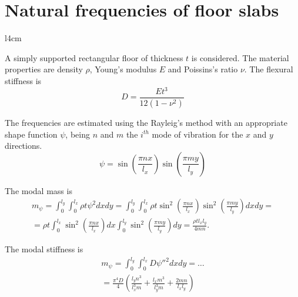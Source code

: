 \documentclass{article}
\begin{document}
\section*{Natural frequencies of floor slabs}

\begin{wrapfigure}{l}{4cm}
\vspace{-1em}
\end{wrapfigure}

A simply supported rectangular floor of thickness $t$ is considered. The material properties are density $\rho$, Young's modulus $E$ and Poissins's ratio $\nu$. The flexural stiffness is
$$
D = \frac{Et^3}{12(1-\nu^2)}
$$

The frequencies are estimated using the Rayleig's method with an appropriate shape function $\psi$, being $n$ and $m$ the $i^{th}$ mode of vibration for the $x$ and $y$ directions.
$$
\psi = \sin\left(\frac{\pi nx}{l_x}\right) \sin\left(\frac{\pi my}{l_y}\right)
$$

The modal mass is
\begin{multline*}
m_\psi = \int_0^{l_y}\int_0^{l_x} \rho t \psi^2 dxdy =
\int_0^{l_y}\int_0^{l_x} \rho t \sin^2\left(\frac{\pi nx}{l_x}\right) \sin^2\left(\frac{\pi my}{l_y}\right) dxdy = \\
= \rho t \int_0^{l_x} \sin^2\left(\frac{\pi nx}{l_x}\right) dx \int_0^{l_y} \sin^2\left(\frac{\pi my}{l_y}\right) dy =
\frac{\rho t l_x l_y}{4mn}.
\end{multline*}

The modal stiffness is
\begin{multline*}
m_\psi = \int_0^{l_y}\int_0^{l_x} D \psi''^2 dxdy = \dots\\
= \frac{\pi^4D}{4}\left(\frac{l_yn^3}{l_x^3m} + \frac{l_xm^3}{l_y^3m} + \frac{2mn}{l_xl_y}\right)
\end{multline*}
\end{document}
